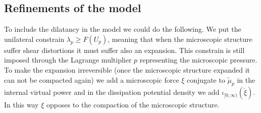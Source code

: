 
\subsection{Refinements of the model}

To include the dilatancy in the model we could do the following. We put the unilateral constrain $\lambda_p\ge F(U_p)$, meaning that when the microscopic structure suffer shear distortions it must suffer also an expansion. This constrain is still imposed through the Lagrange multiplier $p$ representing the microscopic pressure. To make the expansion irreversible (once the microscopic structure expanded it can not be compacted again) we add a microscopic force $\xi$ conjugate to $\tilde\mu_p$ in the internal virtual power and in the dissipation potential density we add $\iota_{[0,\infty)}(\dot\xi)$. In this way $\xi$ opposes to the compaction of the microscopic structure.

